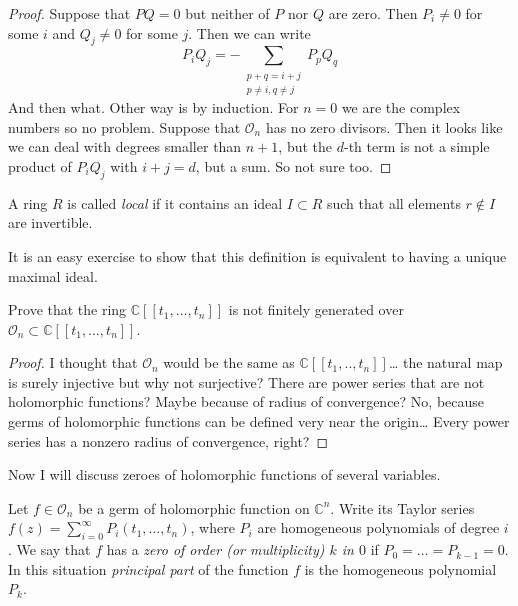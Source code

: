 \begin{proof}
Suppose that $PQ=0$ but neither of $P$ nor
$Q$ are zero. Then $P_i \neq 0$ for
some $i$ and $Q_j \neq 0$ for some $j$. Then
we can write
$$
P_iQ_j=-\sum_{\substack{p+q=i+j \\ p\neq
i,q\neq j}}P_pQ_q
$$
And then what. Other way is by induction. For
$n=0$ we are the complex numbers
so no problem. Suppose that $\mathcal{O}_n$
has no zero divisors. Then it looks
like we can deal with degrees smaller than
$n+1$, but the $d$-th term is not a
simple product of $P_iQ_j$ with $i+j=d$, but
a sum. So not sure too.
\end{proof}

\begin{definition}
\label{definition-local-ring}
A ring $R$ is called {\it local} if it
contains an ideal $I\subset R$ such that
all elements $r \not \in I$ are invertible.
\end{definition}

It is an easy exercise to show that this
definition is equivalent to having a
unique maximal ideal.

\begin{exercise}
\label{exercise-power-serie-not-finit-gene}
Prove that the ring $\mathbb{C}[\![
t_1,\ldots,t_n]\!]$ is not
finitely generated over $\mathcal{O}_n
\subset
\mathbb{C}[\![ t_1,\ldots,t_n]\!]$.
\end{exercise}

\begin{proof}
I thought that $\mathcal{O}_n$ would be the
same as
$\mathbb{C}[\![ t_1,..,t_n]\!]$…
the natural map is surely injective
but why not surjective? There are power
series that are not holomorphic
functions? Maybe because of radius of
convergence? No, because germs of
holomorphic functions can be defined very
near the origin… Every power series
has a nonzero radius of convergence, right?
\end{proof}

\noindent
Now I will discuss zeroes of holomorphic
functions of several variables.

\begin{definition}
\label{definition-zero-holom-funct-sever}
Let  $f\in \mathcal{O}_n$ be a germ of
holomorphic function on $\mathbb{C}^n$.
Write its Taylor series
$f(z)=\sum_{i=0}^\infty P_i(t_1,\ldots,t_n)$,
where
$P_i$ are homogeneous polynomials of degree
$i$. We say that $f$ has a {\it
zero of order (or multiplicity) $k$ in $0$}
if $P_0=\ldots=P_{k-1}=0$. In this
situation {\it principal part} of the
function $f$ is the homogeneous polynomial
$P_k$.
\end{definition}

